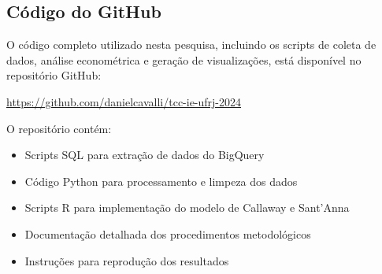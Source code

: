 \documentclass[
	12pt,				%
	openright,			%
	oneside,			%
	a4paper,			%
	english,			%
	french,				%
	spanish,			%
	brazil				%
	]{abntex2}
\begin{document}
\postextual



%
%


\begin{apendicesenv}

\partapendices

\chapter{Código do GitHub}

O código completo utilizado nesta pesquisa, incluindo os scripts de coleta de dados, análise econométrica e geração de visualizações, está disponível no repositório GitHub:

\url{https://github.com/danielcavalli/tcc-ie-ufrj-2024}

O repositório contém:
\begin{itemize}
\item Scripts SQL para extração de dados do BigQuery
\item Código Python para processamento e limpeza dos dados
\item Scripts R para implementação do modelo de Callaway e Sant'Anna
\item Documentação detalhada dos procedimentos metodológicos
\item Instruções para reprodução dos resultados
\end{itemize}

\end{apendicesenv}


\end{document}
